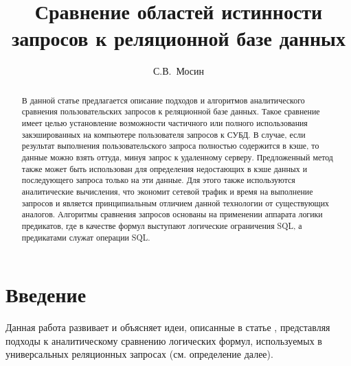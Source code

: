 \documentclass{cmi}
\begin{document}
\author{С.В.~Мосин}
\title{Сравнение областей истинности запросов к реляционной базе данных}


\maketitle{}

\begin{abstract}%
В данной статье предлагается описание подходов и алгоритмов аналитического сравнения пользовательских
запросов к реляционной базе данных. Такое сравнение имеет целью установление возможности частичного или
полного использования закэшированных на компьютере пользователя запросов к СУБД. В случае, если результат
выполнения пользовательского запроса полностью содержится в кэше, то данные можно взять оттуда, минуя
запрос к удаленному серверу. Предложенный метод также может быть использован для определения недостающих в
кэше данных и последующего запроса только на эти данные. Для этого также используются аналитические
вычисления, что экономит сетевой трафик и время на выполнение запросов и является принципиальным отличием
данной технологии от существующих аналогов. Алгоритмы сравнения запросов основаны на применении аппарата
логики предикатов, где в качестве формул выступают логические ограничения SQL, а предикатами служат операции
SQL.

\end{abstract}



\section*{Введение}
\label{sec-intro}
Данная работа развивает и объясняет идеи, описанные в статье \cite{mosin_zykin}, представляя подходы
к аналитическому сравнению логических формул, используемых в универсальных реляционных запросах (см.
определение далее).
\end{document}

